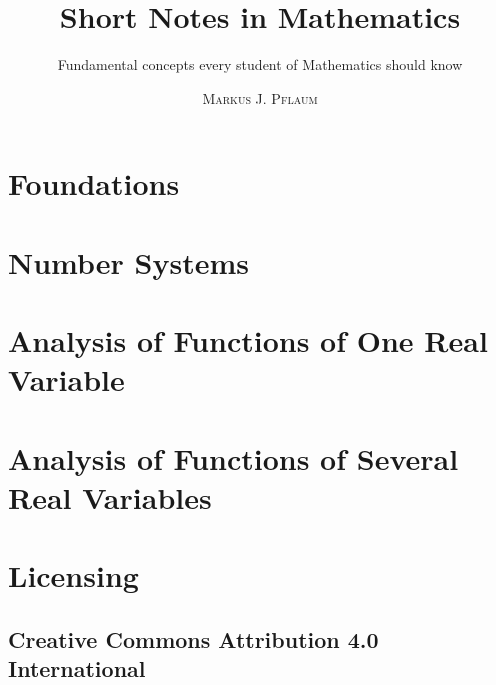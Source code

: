 




\title{Short Notes in Mathematics}
\subtitle{Fundamental concepts every student of Mathematics should know} 
\author{{\scshape Markus J. Pflaum}}
\maketitle

\tableofcontents

\label{section-phantom}
\newpage
\section{Foundations}

\newpage
\section{Number Systems}

\newpage
\section{Analysis of Functions of One Real Variable}

\newpage
\section{Analysis of Functions of Several Real Variables}

\newpage
\section*{Licensing}
\label{sec:licenses}
\subsection*{Creative Commons Attribution 4.0 International}

%
\newpage


\ohead{}


